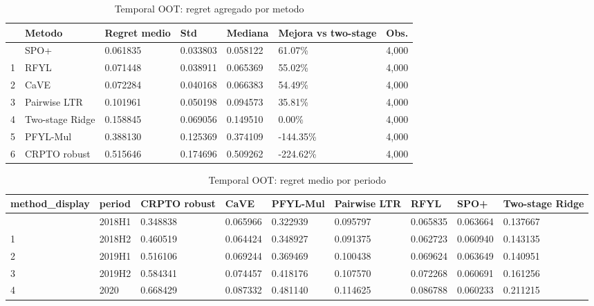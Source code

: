 \documentclass[
  spanish,
  11pt,
  letterpaper,
]{scrbook}
\theoremstyle{plain}
\theoremstyle{remark}
\begin{document}
{

\begin{longtable}[]{@{}lllllll@{}}

\caption{\label{tbl-p4-pyepo-temporal-summary}Temporal OOT: regret
agregado por metodo}

\tabularnewline

\toprule\noalign{}
& Metodo & Regret medio & Std & Mediana & Mejora vs two-stage & Obs. \\
\midrule\noalign{}
\endhead
\bottomrule\noalign{}
\endlastfoot
0 & SPO+ & 0.061835 & 0.033803 & 0.058122 & 61.07\% & 4,000 \\
1 & RFYL & 0.071448 & 0.038911 & 0.065369 & 55.02\% & 4,000 \\
2 & CaVE & 0.072284 & 0.040168 & 0.066383 & 54.49\% & 4,000 \\
3 & Pairwise LTR & 0.101961 & 0.050198 & 0.094573 & 35.81\% & 4,000 \\
4 & Two-stage Ridge & 0.158845 & 0.069056 & 0.149510 & 0.00\% & 4,000 \\
5 & PFYL-Mul & 0.388130 & 0.125369 & 0.374109 & -144.35\% & 4,000 \\
6 & CRPTO robust & 0.515646 & 0.174696 & 0.509262 & -224.62\% & 4,000 \\

\end{longtable}

}

{

\begin{longtable}[]{@{}lllllllll@{}}

\caption{\label{tbl-p4-pyepo-temporal-period}Temporal OOT: regret medio
por periodo}

\tabularnewline

\toprule\noalign{}
method\_display & period & CRPTO robust & CaVE & PFYL-Mul & Pairwise LTR
& RFYL & SPO+ & Two-stage Ridge \\
\midrule\noalign{}
\endhead
\bottomrule\noalign{}
\endlastfoot
0 & 2018H1 & 0.348838 & 0.065966 & 0.322939 & 0.095797 & 0.065835 &
0.063664 & 0.137667 \\
1 & 2018H2 & 0.460519 & 0.064424 & 0.348927 & 0.091375 & 0.062723 &
0.060940 & 0.143135 \\
2 & 2019H1 & 0.516106 & 0.069244 & 0.369469 & 0.100438 & 0.069624 &
0.063649 & 0.140951 \\
3 & 2019H2 & 0.584341 & 0.074457 & 0.418176 & 0.107570 & 0.072268 &
0.060691 & 0.161256 \\
4 & 2020 & 0.668429 & 0.087332 & 0.481140 & 0.114625 & 0.086788 &
0.060233 & 0.211215 \\

\end{longtable}

}
\end{document}
